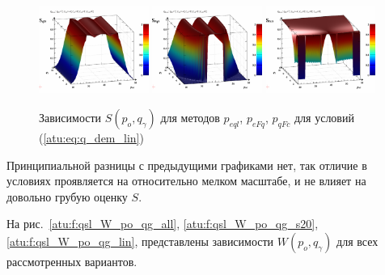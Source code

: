 \begin{figure}[htb!]
  \centerline{
    \includegraphics[width=0.32\textwidth]{p/qls_pe-p_po_qg_Sql_lin.png}
    \hfill
    \includegraphics[width=0.32\textwidth]{p/qls_pe-p_po_qg_SFq_lin.png}
    \hfill
    \includegraphics[width=0.32\textwidth]{p/qls_pe-p_po_qg_SFc_lin.png}
  }
  \caption{Зависимости $S(p_o,q_\gamma)$ для методов $p_{eql}$, $p_{eFq}$, $p_{qFc}$ для условий (\ref{atu:eq:q_dem_lin})}
  \label{atu:f:qsl_S_po_qg_lin}
\end{figure}

Принципиальной разницы с предыдущими графиками нет, так отличие
в условиях проявляется на относительно мелком масштабе,
и не влияет на довольно грубую оценку $S$.

На рис.~\ref{atu:f:qsl_W_po_qg_all}, \ref{atu:f:qsl_W_po_qg_s20}, \ref{atu:f:qsl_W_po_qg_lin},
представлены зависимости $W(p_o,q_\gamma)$
для всех рассмотренных вариантов.

